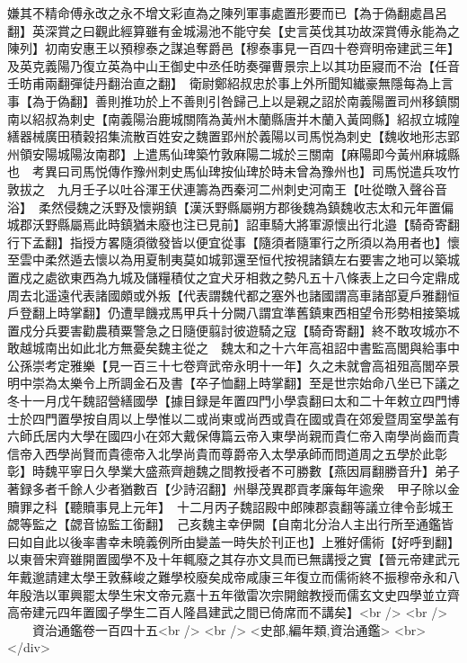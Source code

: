 嫌其不精命傅永改之永不增文彩直為之陳列軍事處置形要而已【為于偽翻處昌呂翻】英深賞之曰觀此經算雖有金城湯池不能守矣【史言英伐其功故深賞傅永能為之陳列】初南安惠王以預穆泰之謀追奪爵邑【穆泰事見一百四十卷齊明帝建武三年】及英克義陽乃復立英為中山王御史中丞任昉奏彈曹景宗上以其功臣寢而不治【任音壬昉甫兩翻彈徒丹翻治直之翻】　衛尉鄭紹叔忠於事上外所聞知纎豪無隱每為上言事【為于偽翻】善則推功於上不善則引咎歸己上以是親之詔於南義陽置司州移鎮關南以紹叔為刺史【南義陽治鹿城關隋為黃州木蘭縣唐并木蘭入黃岡縣】紹叔立城隍繕器械廣田積穀招集流散百姓安之魏置郢州於義陽以司馬悦為刺史【魏收地形志郢州領安陽城陽汝南郡】上遣馬仙琕築竹敦麻陽二城於三關南【麻陽即今黃州麻城縣也　考異曰司馬悦傳作豫州刺史馬仙琕按仙琕於時未曾為豫州也】司馬悦遣兵攻竹敦拔之　九月壬子以吐谷渾王伏連籌為西秦河二州刺史河南王【吐從暾入聲谷音浴】　柔然侵魏之沃野及懷朔鎮【漢沃野縣屬朔方郡後魏為鎮魏收志太和元年置偏城郡沃野縣屬焉此時鎮猶未廢也注已見前】詔車騎大將軍源懷出行北邉【騎奇寄翻行下孟翻】指授方畧隨須徵發皆以便宜從事【隨須者隨軍行之所須以為用者也】懷至雲中柔然遁去懷以為用夏制夷莫如城郭還至恒代按視諸鎮左右要害之地可以築城置戍之處欲東西為九城及儲糧積仗之宜犬牙相救之勢凡五十八條表上之曰今定鼎成周去北遥遠代表諸國頗或外叛【代表謂魏代都之塞外也諸國謂高車諸部夏戶雅翻恒戶登翻上時掌翻】仍遭旱饑戎馬甲兵十分闕八謂宜準舊鎮東西相望令形勢相接築城置戍分兵要害勸農積粟警急之日隨便翦討彼遊騎之寇【騎奇寄翻】終不敢攻城亦不敢越城南出如此北方無憂矣魏主從之　魏太和之十六年高祖詔中書監高閭與給事中公孫崇考定雅樂【見一百三十七卷齊武帝永明十一年】久之未就會高祖殂高閭卒景明中崇為太樂令上所調金石及書【卒子恤翻上時掌翻】至是世宗始命八坐已下議之　冬十一月戊午魏詔營繕國學【據目録是年置四門小學袁翻曰太和二十年敕立四門博士於四門置學按自周以上學惟以二或尚東或尚西或貴在國或貴在郊爰暨周室學盖有六師氏居内大學在國四小在郊大戴保傳篇云帝入東學尚親而貴仁帝入南學尚齒而貴信帝入西學尚賢而貴德帝入北學尚貴而尊爵帝入太學承師而問道周之五學於此彰彰】時魏平寧日久學業大盛燕齊趙魏之間教授者不可勝數【燕因肩翻勝音升】弟子著録多者千餘人少者猶數百【少詩沼翻】州舉茂異郡貢孝廉每年逾衆　甲子除以金贖罪之科【聽贖事見上元年】　十二月丙子魏詔殿中郎陳郡袁翻等議立律令彭城王勰等監之【勰音協監工銜翻】　己亥魏主幸伊闕【自南北分治人主出行所至通鑑皆曰如自此以後率書幸未曉義例所由變盖一時失於刊正也】上雅好儒術【好呼到翻】以東晉宋齊雖開置國學不及十年輒廢之其存亦文具而已無講授之實【晉元帝建武元年戴邈請建太學王敦蘇峻之難學校廢矣成帝咸康三年復立而儒術終不振穆帝永和八年殷浩以軍興罷太學生宋文帝元嘉十五年徵雷次宗開館教授而儒玄文史四學並立齊高帝建元四年置國子學生二百人隆昌建武之間已倚席而不講矣】<br />
<br />
　　資治通鑑卷一百四十五<br />
<br />
<史部,編年類,資治通鑑>  <br>
   </div> 

